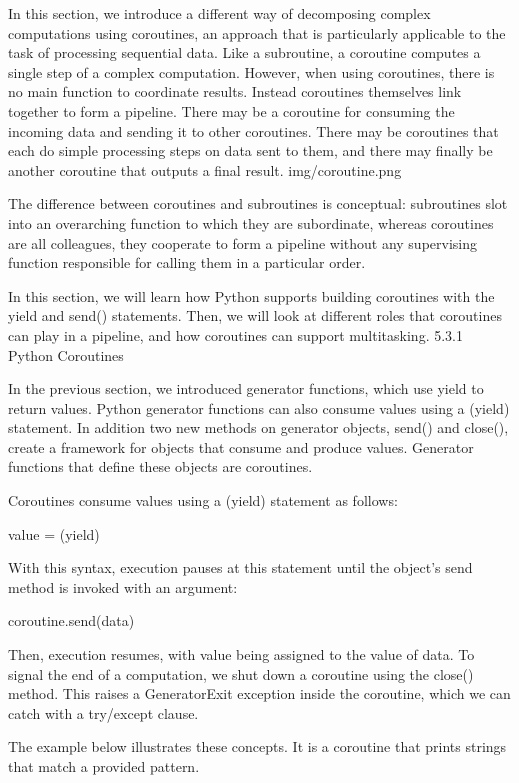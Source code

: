 \documentclass[letterpaper,10pt,dvipdfmx]{sphinxmanual}
\begin{document}
In this section, we introduce a different way of decomposing complex computations using coroutines, an approach that is particularly applicable to the task of processing sequential data. Like a subroutine, a coroutine computes a single step of a complex computation. However, when using coroutines, there is no main function to coordinate results. Instead coroutines themselves link together to form a pipeline. There may be a coroutine for consuming the incoming data and sending it to other coroutines. There may be coroutines that each do simple processing steps on data sent to them, and there may finally be another coroutine that outputs a final result.
img/coroutine.png

The difference between coroutines and subroutines is conceptual: subroutines slot into an overarching function to which they are subordinate, whereas coroutines are all colleagues, they cooperate to form a pipeline without any supervising function responsible for calling them in a particular order.

In this section, we will learn how Python supports building coroutines with the yield and send() statements. Then, we will look at different roles that coroutines can play in a pipeline, and how coroutines can support multitasking.
5.3.1   Python Coroutines

In the previous section, we introduced generator functions, which use yield to return values. Python generator functions can also consume values using a (yield) statement. In addition two new methods on generator objects, send() and close(), create a framework for objects that consume and produce values. Generator functions that define these objects are coroutines.

Coroutines consume values using a (yield) statement as follows:

value = (yield)

With this syntax, execution pauses at this statement until the object's send method is invoked with an argument:

coroutine.send(data)

Then, execution resumes, with value being assigned to the value of data. To signal the end of a computation, we shut down a coroutine using the close() method. This raises a GeneratorExit exception inside the coroutine, which we can catch with a try/except clause.

The example below illustrates these concepts. It is a coroutine that prints strings that match a provided pattern.
\end{document}
